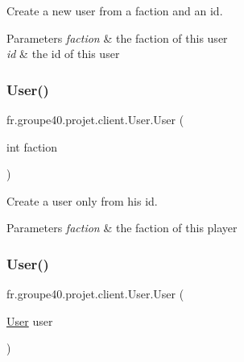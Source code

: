 Create a new user from a faction and an id. 


\begin{DoxyParams}{Parameters}
{\em faction} & the faction of this user \\
\hline
{\em id} & the id of this user \\
\hline
\end{DoxyParams}
\mbox{\label{classfr_1_1groupe40_1_1projet_1_1client_1_1_user_ae3f43ec29e7b599c4f203bc0fa9c5fd5}} 
\subsubsection{\texorpdfstring{User()}{User()}\hspace{0.1cm}{\footnotesize\ttfamily [2/3]}}
{\footnotesize\ttfamily fr.\+groupe40.\+projet.\+client.\+User.\+User (\begin{DoxyParamCaption}\item[{int}]{faction }\end{DoxyParamCaption})}



Create a user only from his id. 


\begin{DoxyParams}{Parameters}
{\em faction} & the faction of this player \\
\hline
\end{DoxyParams}
\mbox{\label{classfr_1_1groupe40_1_1projet_1_1client_1_1_user_aadb257aeb0ed9544df923a83f8ed1e61}} 
\subsubsection{\texorpdfstring{User()}{User()}\hspace{0.1cm}{\footnotesize\ttfamily [3/3]}}
{\footnotesize\ttfamily fr.\+groupe40.\+projet.\+client.\+User.\+User (\begin{DoxyParamCaption}\item[{\hyperlink{classfr_1_1groupe40_1_1projet_1_1client_1_1_user}{User}}]{user }\end{DoxyParamCaption})}



